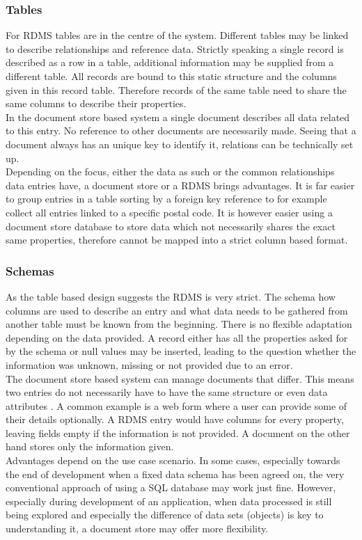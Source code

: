 \subsubsection{Tables}
For RDMS tables are in the centre of the system. Different tables may be linked to describe relationships and reference data. Strictly speaking a single record is described as a row in a table, additional information may be supplied from a different table. All records are bound to this static structure and the columns given in this record table. Therefore records of the same table need to share the same columns to describe their properties.\\
In the document store based system a single document describes all data related to this entry. No reference to other documents are necessarily made. Seeing that a document always has an unique key to identify it, relations can be technically set up.\\
Depending on the focus, either the data as such or the common relationships data entries have, a document store or a RDMS brings advantages. It is far easier to group entries in a table sorting by a foreign key reference to for example collect all entries linked to a specific postal code. It is however easier using a document store database to store data which not necessarily shares the exact same properties, therefore cannot be mapped into a strict column based format.
\subsubsection{Schemas}
As the table based design suggests the RDMS is very strict. The schema how columns are used to describe an entry and what data needs to be gathered from another table must be known from the beginning. There is no flexible adaptation depending on the data provided. A record either has all the properties asked for by the schema or null values may be inserted, leading to the question whether the information was unknown, missing or not provided due to an error.\\
The document store based system can manage documents that differ. This means two entries do not necessarily have to have the same structure or even data attributes \parencite{amazonNoSql}\parencite{objelean}. A common example is a web form where a user can provide some of their details optionally. A RDMS entry would have columns for every property, leaving fields empty if the information is not provided. A document on the other hand stores only the information given.\\
Advantages depend on the use case scenario. In some cases, especially towards the end of development when a fixed data schema has been agreed on, the very conventional approach of using a SQL database may work just fine. However, especially during development of an application, when data processed is still being explored and especially the difference of data sets (objects) is key to understanding it, a document store may offer more flexibility.
